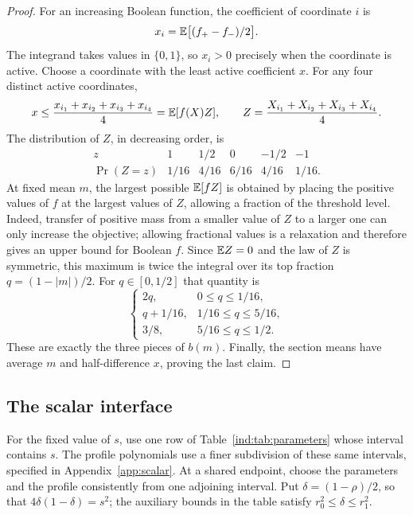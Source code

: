 \begin{proof}
For an increasing Boolean function, the coefficient of coordinate $i$ is
\[
 x_i=\mathbb E\bigl[(f_+-f_-)/2\bigr].
\]
The integrand takes values in $\{0,1\}$, so $x_i>0$ precisely when the
coordinate is active.  Choose a coordinate with the least active
coefficient $x$.  For any four distinct active coordinates,
\[
 x\le\frac{x_{i_1}+x_{i_2}+x_{i_3}+x_{i_4}}4
   =\mathbb E[f(X)Z],\qquad
 Z=\frac{X_{i_1}+X_{i_2}+X_{i_3}+X_{i_4}}4.
\]
The distribution of $Z$, in decreasing order, is
\[
\begin{array}{c|rrrrr}
z&1&1/2&0&-1/2&-1\\ \hline
\Pr(Z=z)&1/16&4/16&6/16&4/16&1/16.
\end{array}
\]
At fixed mean $m$, the largest possible $\mathbb E[fZ]$ is obtained by placing
the positive values of $f$ at the largest values of $Z$, allowing a
fraction of the threshold level.  Indeed, transfer of positive mass from
a smaller value of $Z$ to a larger one can only increase the objective;
allowing fractional values is a relaxation and therefore gives an upper
bound for Boolean $f$.  Since $\mathbb E Z=0$ and the law of $Z$ is symmetric,
this maximum is twice the integral over its top fraction
$q=(1-|m|)/2$.  For $q\in[0,1/2]$ that quantity is
\[
 \begin{cases}
 2q,&0\le q\le1/16,\\
 q+1/16,&1/16\le q\le5/16,\\
 3/8,&5/16\le q\le1/2.
 \end{cases}
\]
These are exactly the three pieces of $b(m)$.  Finally, the section
means have average $m$ and half-difference $x$, proving the last claim.
\end{proof}

\subsection{The scalar interface}

For the fixed value of $s$, use one row of
Table~\ref{ind:tab:parameters} whose interval contains $s$.  The profile
polynomials use a finer subdivision of these same intervals, specified
in Appendix~\ref{app:scalar}.  At a shared endpoint, choose the parameters
and the profile consistently from one adjoining interval.  Put
$\delta=(1-\rho)/2$, so that $4\delta(1-\delta)=s^2$; the auxiliary
bounds in the table satisfy $r_0^2\le\delta\le r_1^2$.

